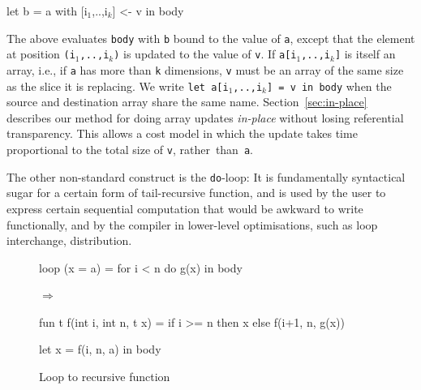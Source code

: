 \documentclass{sigplanconf}  %
\newcommand{\mymath}[1]{$ #1 $}
\newcommand{\myindx}[1]{_{#1}}
\begin{document}
\begin{colorcode}
let b = a with [i\mymath{\myindx{1}},..,i\mymath{\myindx{k}}] <- v in body
\end{colorcode}

The above evaluates {\tt body} with {\tt b} bound to the value of {\tt a}, 
except that the element at position {\tt (i$_1$,..,i$_k$)} is updated to
the value of {\tt v}.  If {\tt a[i$_1$,..,i$_k$]} is itself an array,
i.e., if {\tt a} has more than {\tt k} dimensions, {\tt v} must be 
an array of the same size as the slice it is replacing.  We write 
{\tt let~a[i$_1$,..,i$_k$]~=~v~in~body} when the 
source and destination array share the same name.
%
Section~\ref{sec:in-place} describes our method for doing array updates 
{\em in-place} without losing referential transparency. This allows a 
cost model in which the update takes time proportional to the total 
size of {\tt v}, rather~than~{\tt a}.

The other non-standard construct is the {\tt do}-loop:  
It is fundamentally syntactical sugar for a certain form of 
tail-recursive function, and is used by the user to express
certain sequential computation that would be awkward to write
functionally, and by the compiler in lower-level optimisations,
such as loop interchange, distribution.  



\begin{figure}
\begin{minipage}{0.35\columnwidth}
\begin{colorcode}
loop (x = a) =
  for i < n do
    g(x)
in body
\end{colorcode}
\end{minipage}
\begin{minipage}{0.05\columnwidth}
$\Rightarrow$
\end{minipage}
\begin{minipage}{0.6\columnwidth}
\begin{colorcode}
fun t f(int i, int n, t x) =
  if i >= n then x
     else f(i+1, n, g(x))

let x = f(i, n, a)
in body
\end{colorcode}
\end{minipage}
\caption{Loop to recursive function}
\label{fig:loop-recursion}
\end{figure}
\end{document}
